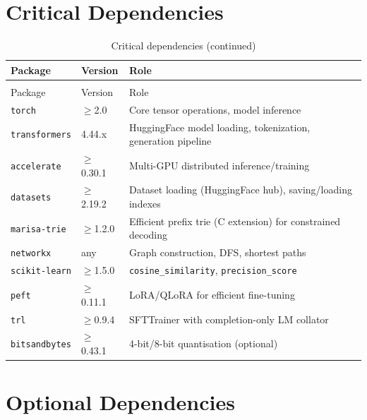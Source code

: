 \documentclass[11pt,a4paper,oneside,openany]{book}
\theoremstyle{definition}
\begin{document}
\section{Critical Dependencies}

\begin{longtable}{lp{3.5cm}p{8cm}}
	\caption{Critical dependencies}
	\label{tab:deps}                                                                                   \\
	\toprule
	Package               & Version     & Role                                                         \\
	\midrule
	\endfirsthead
	\caption[]{Critical dependencies (continued)}                                                      \\
	\toprule
	Package               & Version     & Role                                                         \\
	\midrule
	\endhead
	\bottomrule
	\endfoot
	\texttt{torch}        & $\ge$2.0    & Core tensor operations, model inference                      \\
	\texttt{transformers} & 4.44.x      & HuggingFace model loading, tokenization, generation pipeline \\
	\texttt{accelerate}   & $\ge$0.30.1 & Multi-GPU distributed inference/training                     \\
	\texttt{datasets}     & $\ge$2.19.2 & Dataset loading (HuggingFace hub), saving/loading indexes    \\
	\texttt{marisa-trie}  & $\ge$1.2.0  & Efficient prefix trie (C extension) for constrained decoding \\
	\texttt{networkx}     & any         & Graph construction, DFS, shortest paths                      \\
	\texttt{scikit-learn} & $\ge$1.5.0  & \texttt{cosine\_similarity}, \texttt{precision\_score}       \\
	\texttt{peft}         & $\ge$0.11.1 & LoRA/QLoRA for efficient fine-tuning                         \\
	\texttt{trl}          & $\ge$0.9.4  & SFTTrainer with completion-only LM collator                  \\
	\texttt{bitsandbytes} & $\ge$0.43.1 & 4-bit/8-bit quantisation (optional)                          \\
\end{longtable}

\section{Optional Dependencies}
\end{document}
